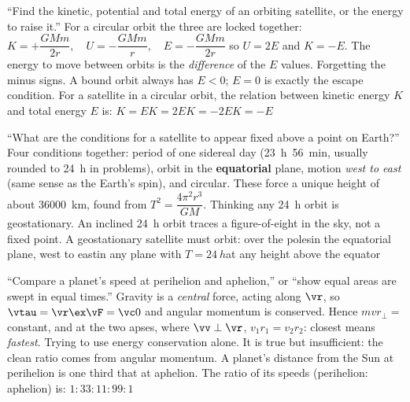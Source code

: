 {``Find the kinetic, potential and total energy of an orbiting satellite, or the energy to raise it.''}
{For a circular orbit the three are locked together:
$\boxed{K=+\dfrac{GMm}{2r},\quad U=-\dfrac{GMm}{r},\quad E=-\dfrac{GMm}{2r}}$
so $U=2E$ and $K=-E$. The energy to move between orbits is the \emph{difference} of the $E$ values.}
{Forgetting the minus signs. A bound orbit always has $E<0$; $E=0$ is exactly the escape condition.}
{For a satellite in a circular orbit, the relation between kinetic energy $K$ and total energy $E$ is:}
{$K=E$}{$K=2E$}{$K=-2E$}{$K=-E$}

{``What are the conditions for a satellite to appear fixed above a point on Earth?''}
{Four conditions together: period of one sidereal day (\SI{23}{h}~\SI{56}{min}, usually rounded to
\SI{24}{h} in problems), orbit in the \textbf{equatorial} plane, motion \emph{west to east} (same sense as the Earth's spin), and circular. These force a unique
height of about \SI{36000}{km}, found from $T^2=\dfrac{4\pi^2r^3}{GM}$.}
{Thinking any \SI{24}{h} orbit is geostationary. An inclined \SI{24}{h} orbit traces a figure-of-eight in
the sky, not a fixed point.}
{A geostationary satellite must orbit:}
{over the poles}{in the equatorial plane, west to east}{in any plane with $T=\SI{24}{h}$}{at any height
above the equator}

{``Compare a planet's speed at perihelion and aphelion,'' or ``show equal areas are swept in equal
times.''}
{Gravity is a \emph{central} force, acting along $\vr$, so $\vtau=\vr\ex\vF=\vc0$ and angular momentum is
conserved. Hence $mvr_\perp=$ constant, and at the two apses, where $\vv\perp\vr$,
$\boxed{v_1r_1=v_2r_2}$: closest means \emph{fastest}.}
{Trying to use energy conservation alone. It is true but insufficient: the clean ratio comes from
angular momentum.}
{A planet's distance from the Sun at perihelion is one third that at aphelion. The ratio of its speeds
(perihelion: aphelion) is:}
{$1:3$}{$3:1$}{$1:9$}{$9:1$}


